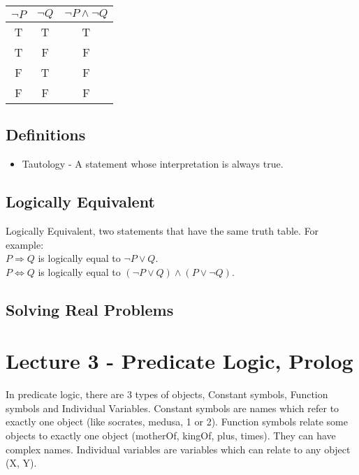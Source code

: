 \documentclass[11pt, oneside]{article}   	%
\begin{document}
\begin{table}[htbp]
   \centering
   \begin{tabular}{@{} cc|c @{}} %
      $\neg P$ & $\neg Q$ & $\neg P \wedge \neg Q$\\
      \midrule
      T & T & T\\
      T & F & F\\
      F & T & F\\
      F & F & F\\
   \end{tabular}
   \label{tab:booktabs}
\end{table}

\subsection{Definitions}
\begin{itemize}
\item Tautology - A statement whose interpretation is always true.
\end{itemize}
\subsection{Logically Equivalent}
Logically Equivalent, two statements that have the same truth table. For example:\\ $P \Rightarrow Q$ is logically equal to $\neg P \vee Q$.\\ $P \Leftrightarrow Q$ is logically equal to $(\neg P \vee Q) \wedge (P \vee \neg Q)$.
\subsection{Solving Real Problems}



\section{Lecture 3 - Predicate Logic, Prolog}

In predicate logic, there are 3 types of objects, Constant symbols, Function symbols and Individual Variables. Constant symbols are names which refer to exactly one object (like socrates, medusa, 1 or 2). Function symbols relate some objects to exactly one object (motherOf, kingOf, plus, times). They can have complex names. Individual variables are variables which can relate to any object (X, Y).
\end{document}

